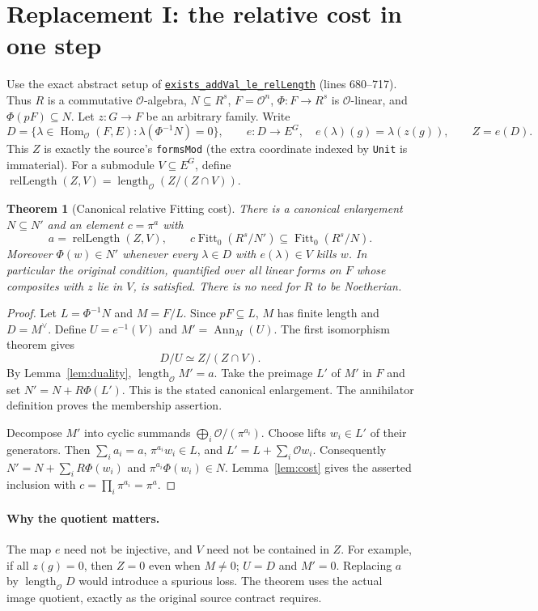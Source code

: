 \documentclass[11pt]{article}
\newtheorem{theorem}{Theorem}[section]
\theoremstyle{remark}\newtheorem{remark}[theorem]{Remark}
\newcommand{\Ocal}{\mathcal O}
\newcommand{\Fitt}{\operatorname{Fitt}_0}
\newcommand{\len}{\operatorname{length}_{\Ocal}}
\newcommand{\Hom}{\operatorname{Hom}_{\Ocal}}
\newcommand{\Ann}{\operatorname{Ann}}
\newcommand{\src}[2]{\href{https://github.com/VladimirReshetnikov/ProveIt/blob/9050b04000647d588d0c78d945180abcd3b0bcf7/Analysis/GeneralizedRiemannHypothesis/Lean/grh/src/#1}{\texttt{#2}}}
\begin{document}
\section{Replacement I: the relative cost in one step}
Use the exact abstract setup of \src{Lib/General/Algebra/FittingIdealsAndLengths.lean\#L680}{exists\_addVal\_le\_relLength} (lines 680--717). Thus $R$ is a commutative $\Ocal$-algebra, $N\subseteq R^s$, $F=\Ocal^n$, $\Phi:F\to R^s$ is $\Ocal$-linear, and $\Phi(pF)\subseteq N$. Let $z:G\to F$ be an arbitrary family. Write
\[
 D=\{\lambda\in\Hom(F,E): \lambda(\Phi^{-1}N)=0\},\qquad
 e:D\to E^G,\quad e(\lambda)(g)=\lambda(z(g)),
 \qquad Z=e(D).
\]
This $Z$ is exactly the source's \texttt{formsMod} (the extra coordinate indexed by \texttt{Unit} is immaterial). For a submodule $V\subseteq E^G$, define $\operatorname{relLength}(Z,V)=\len(Z/(Z\cap V))$.
\begin{theorem}[Canonical relative Fitting cost]\label{thm:relative}
There is a canonical enlargement $N\subseteq N'$ and an element $c=\pi^a$ with
\[
 a=\operatorname{relLength}(Z,V),\qquad
 c\Fitt(R^s/N')\subseteq\Fitt(R^s/N).
\]
Moreover $\Phi(w)\in N'$ whenever every $\lambda\in D$ with $e(\lambda)\in V$ kills $w$. In particular the original condition, quantified over all linear forms on $F$ whose composites with $z$ lie in $V$, is satisfied. There is no need for $R$ to be Noetherian.
\end{theorem}
\begin{proof}
Let $L=\Phi^{-1}N$ and $M=F/L$. Since $pF\subseteq L$, $M$ has finite length and $D=M^\vee$. Define $U=e^{-1}(V)$ and $M'=\Ann_M(U)$. The first isomorphism theorem gives
\[
 D/U\simeq Z/(Z\cap V).
\]
By Lemma~\ref{lem:duality}, $\len M'=a$. Take the preimage $L'$ of $M'$ in $F$ and set $N'=N+R\Phi(L')$. This is the stated canonical enlargement. The annihilator definition proves the membership assertion.

Decompose $M'$ into cyclic summands $\bigoplus_i\Ocal/(\pi^{a_i})$. Choose lifts $w_i\in L'$ of their generators. Then $\sum_i a_i=a$, $\pi^{a_i}w_i\in L$, and $L'=L+\sum_i\Ocal w_i$. Consequently $N'=N+\sum_iR\Phi(w_i)$ and $\pi^{a_i}\Phi(w_i)\in N$. Lemma~\ref{lem:cost} gives the asserted inclusion with $c=\prod_i\pi^{a_i}=\pi^a$.
\end{proof}
\paragraph{Why the quotient matters.} The map $e$ need not be injective, and $V$ need not be contained in $Z$. For example, if all $z(g)=0$, then $Z=0$ even when $M\ne0$; $U=D$ and $M'=0$. Replacing $a$ by $\len D$ would introduce a spurious loss. The theorem uses the actual image quotient, exactly as the original source contract requires.
\end{document}
